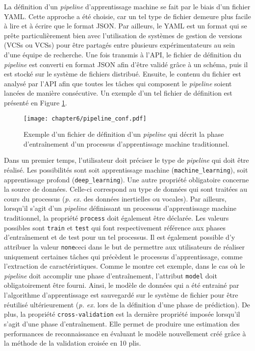 La définition d'un \textit{pipeline} d'apprentissage machine se fait par le biais d'un fichier \ac{YAML}. Cette approche a été choisie, car un tel type de fichier demeure plus facile à lire et à écrire que le format \acs{JSON}. Par ailleurs, le \acs{YAML} est un format qui se prête particulièrement bien avec l'utilisation de systèmes de gestion de versions (\aclp{VCS} ou \acsp{VCS}) pour être partagés entre plusieurs expérimentateurs au sein d'une équipe de recherche. Une fois transmis à l'\acs{API}, le fichier de définition du \textit{pipeline} est converti en format JSON afin d'être validé grâce à un schéma, puis il est stocké sur le système de fichiers distribué. Ensuite, le contenu du fichier est analysé par l'\acs{API} afin que toutes les tâches qui composent le \textit{pipeline} soient lancées de manière consécutive. Un exemple d'un tel fichier de définition est présenté en Figure \ref{fig:pipeline_conf}.

\begin{figure}[H]
	\centering
	\texttt{[image: chapter6/pipeline\_conf.pdf]}
        \caption{Exemple d'un fichier de définition d'un \textit{pipeline} qui décrit la phase d'entraînement d'un processus d'apprentissage machine traditionnel.}
	\label{fig:pipeline_conf}
\end{figure}

Dans un premier temps, l'utilisateur doit préciser le type de \textit{pipeline} qui doit être réalisé. Les possibilités sont soit apprentissage machine (\texttt{machine\_learning}), soit apprentissage profond (\texttt{deep\_learning}). Une autre propriété obligatoire concerne la source de données. Celle-ci correspond au type de données qui sont traitées au cours du processus (\textit{p. ex.} des données inertielles ou vocales). Par ailleurs, lorsqu'il s'agit d'un \textit{pipeline} définissant un processus d'apprentissage machine traditionnel, la propriété \texttt{process} doit également être déclarée. Les valeurs possibles sont \texttt{train} et \texttt{test} qui font respectivement référence aux phases d'entraînement et de test pour un tel processus. Il est également possible d'y attribuer la valeur \texttt{none}\textemdash ceci dans le but de permettre aux utilisateurs de réaliser uniquement certaines tâches qui précèdent le processus d'apprentissage, comme l'extraction de caractéristiques. Comme le montre cet exemple, dans le cas où le \textit{pipeline} doit accomplir une phase d'entraînement, l'attribut \texttt{model} doit obligatoirement être fourni. Ainsi, le modèle de données qui a été entrainé par l'algorithme d'apprentissage est sauvegardé sur le système de fichier pour être réutilisé ultérieurement (\textit{p. ex.} lors de la définition d'une phase de prédiction). De plus, la propriété \texttt{cross-validation} est la dernière propriété imposée lorsqu'il s'agit d'une phase d'entraînement. Elle permet de produire une estimation des performances de reconnaissance en évaluant le modèle nouvellement créé grâce à la méthode de la validation croisée en 10 plis.

